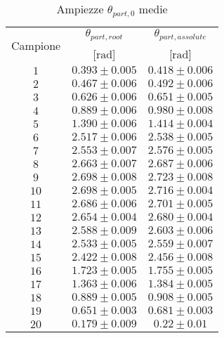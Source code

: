 \documentclass[a4paper,11pt,oneside]{article}
\begin{document}
\begin{table}[h!]
    \centering
    \caption{Ampiezze $\theta_{part, 0}$ medie}
    \label{tab:theta_medie}
    \begin{tabular}{|c|c|c|}
        \hline
        \multirow{2}{*}{Campione} & $\theta_{part,root}$ & $\theta_{part,assolute}$ \\
        & [$\si{\radian}$] & [$\si{\radian}$] \\ \hline
        \rowcolor[rgb]{0.85,0.85,0.85}$1$ & $0.393 \pm 0.005$ & $0.418 \pm 0.006$ \\ \hline
        $2$ & $0.467 \pm 0.006$ & $0.492 \pm 0.006$ \\ \hline
        \rowcolor[rgb]{0.85,0.85,0.85}$3$ & $0.626 \pm 0.006$ & $0.651 \pm 0.005$ \\ \hline
        $4$ & $0.889 \pm 0.006$ & $0.980 \pm 0.008$ \\ \hline
        \rowcolor[rgb]{0.85,0.85,0.85}$5$ & $1.390 \pm 0.006$ & $1.414 \pm 0.004$ \\ \hline
        $6$ & $2.517 \pm 0.006$ & $2.538 \pm 0.005$ \\ \hline
        \rowcolor[rgb]{0.85,0.85,0.85}$7$ & $2.553 \pm 0.007$ & $2.576 \pm 0.005$ \\ \hline
        $8$ & $2.663 \pm 0.007$ & $2.687 \pm 0.006$ \\ \hline
        \rowcolor[rgb]{0.85,0.85,0.85}$9$ & $2.698 \pm 0.008$ & $2.723 \pm 0.008$ \\ \hline
        $10$ & $2.698 \pm 0.005$ & $2.716 \pm 0.004$ \\ \hline
        \rowcolor[rgb]{0.85,0.85,0.85}$11$ & $2.686 \pm 0.006$ & $2.701 \pm 0.005$ \\ \hline
        $12$ & $2.654 \pm 0.004$ & $2.680 \pm 0.004$ \\ \hline
        \rowcolor[rgb]{0.85,0.85,0.85}$13$ & $2.588 \pm 0.009$ & $2.603 \pm 0.006$ \\ \hline
        $14$ & $2.533 \pm 0.005$ & $2.559 \pm 0.007$ \\ \hline
        \rowcolor[rgb]{0.85,0.85,0.85}$15$ & $2.422 \pm 0.008$ & $2.456 \pm 0.008$ \\ \hline
        $16$ & $1.723 \pm 0.005$ & $1.755 \pm 0.005$ \\ \hline
        \rowcolor[rgb]{0.85,0.85,0.85}$17$ & $1.363 \pm 0.006$ & $1.384 \pm 0.005$ \\ \hline
        $18$ & $0.889 \pm 0.005$ & $0.908 \pm 0.005$ \\ \hline
        \rowcolor[rgb]{0.85,0.85,0.85}$19$ & $0.651 \pm 0.003$ & $0.681 \pm 0.003$ \\ \hline
        $20$ & $0.179 \pm 0.009$ & $0.22 \pm 0.01$ \\ \hline
    \end{tabular}
\end{table}
\end{document}
